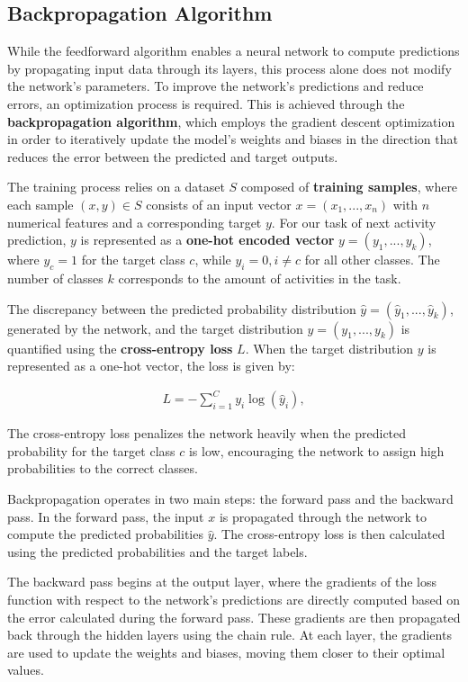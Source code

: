 \subsection{Backpropagation Algorithm}
\label{sec:backpropagation}
While the feedforward algorithm enables a neural network to compute predictions
by propagating input data through its layers,
this process alone does not modify the network's parameters.
To improve the network's predictions and reduce errors,
an optimization process is required.
This is achieved through the \textbf{backpropagation algorithm},
which employs the gradient descent optimization in order to
iteratively update the model's weights and biases in the direction that reduces the error
between the predicted and target outputs.

The training process relies on a dataset $S$ composed of \textbf{training samples},
where each sample $(x,y) \in S$ consists of an input vector $x=(x_1,...,x_n)$ with $n$ numerical features
and a corresponding target $y$.
For our task of next activity prediction,
$y$ is represented as a \textbf{one-hot encoded vector} $y = (y_1, ..., y_k)$,
where $y_c = 1$ for the target class $c$, while $y_i = 0, i \neq c$ for all other classes.
The number of classes $k$ corresponds to the amount of activities in the task.

The discrepancy between the predicted probability distribution $\hat{y} = (\hat{y}_1, ..., \hat{y}_k)$,
generated by the network, and the target distribution $y = (y_1, ..., y_k)$
is quantified using the \textbf{cross-entropy loss} $L$.
When the target distribution $y$ is represented as a one-hot vector, the loss is given by:

\begin{align} L = - \sum_{i=1}^C y_i \log(\hat{y}_i), \end{align}

The cross-entropy loss penalizes the network heavily when the predicted probability for the target class $c$ is low,
encouraging the network to assign high probabilities to the correct classes.

Backpropagation operates in two main steps: the forward pass and the backward pass.
In the forward pass,
the input $x$ is propagated through the network to compute the predicted probabilities $\hat{y}$.
The cross-entropy loss is then calculated using the predicted probabilities and the target labels.

The backward pass begins at the output layer,
where the gradients of the loss function with respect to the network's predictions are directly computed
based on the error calculated during the forward pass.
These gradients are then propagated back through the hidden layers using the chain rule.
At each layer, the gradients are used to update the weights and biases,
moving them closer to their optimal values.

